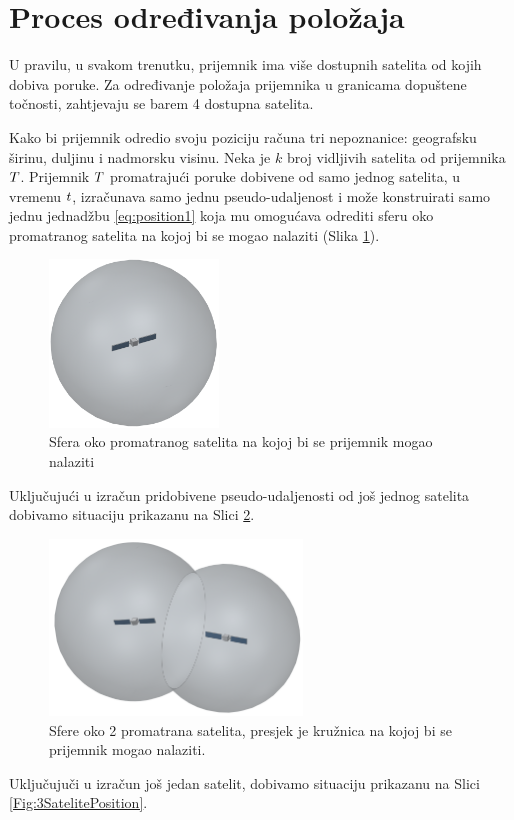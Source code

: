 \documentclass[a4paper,twoside,12pt]{memoir} %
\begin{document}
	\section{Proces određivanja položaja}\label{sec:positionProcess}
	U pravilu, u svakom trenutku, prijemnik ima više dostupnih satelita od kojih dobiva poruke. Za određivanje položaja prijemnika u granicama dopuštene točnosti, %
	zahtjevaju se barem 4 dostupna satelita\label{stranica:4satelita}.
	
	Kako bi prijemnik odredio svoju poziciju računa tri nepoznanice: geografsku širinu, duljinu i nadmorsku visinu.
	Neka je $k$ broj vidljivih satelita od prijemnika $\mathnormal{T}$.
	Prijemnik $\mathnormal{T}$ promatrajući poruke dobivene od samo jednog satelita,
	u vremenu $\mathnormal{t}$, izračunava samo jednu pseudo-udaljenost i može konstruirati samo jednu jednadžbu \ref{eq:position1}
	 koja mu omogućava odrediti sferu oko promatranog satelita na kojoj bi se mogao nalaziti (Slika \ref{Fig:1SatelitePosition}).
	
	\begin{figure}[H]
		\centering
		\includegraphics[width=0.4\textwidth]{satellite_distance_13D}
		\caption{Sfera oko promatranog satelita na kojoj bi se prijemnik mogao nalaziti \cite{gps:2}}
		\label{Fig:1SatelitePosition}
	\end{figure}
	Uključujući u izračun pridobivene pseudo-udaljenosti od još jednog satelita dobivamo situaciju prikazanu na Slici \ref{Fig:2SatelitePosition}.
	\begin{figure}[H]
		\centering
		\includegraphics[width=0.6\textwidth]{satellites_distance_23D}
		\caption{Sfere oko 2 promatrana satelita, presjek je kružnica na kojoj bi se prijemnik mogao nalaziti. \cite{gps:2}}
		\label{Fig:2SatelitePosition}
	\end{figure}
	Uključujuči u izračun još jedan satelit, dobivamo situaciju prikazanu na Slici \ref{Fig:3SatelitePosition}.
	
\end{document}
